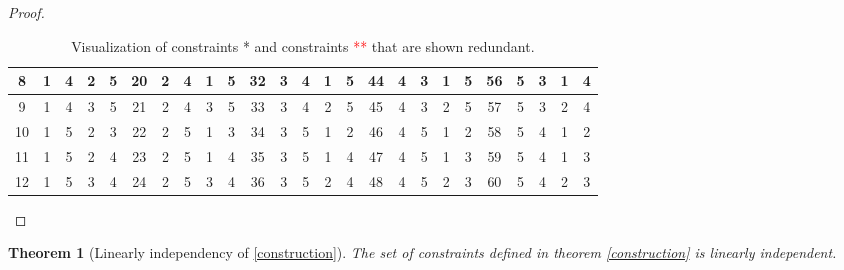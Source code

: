 \documentclass{scrartcl}
\newtheorem{theorem}{Theorem}
\theoremstyle{plain}
\begin{document}
\begin{proof}
\begin{table}[h!]
{\begin{tabular}{||c | c c c c||c | c c c c||c | c c c c||c | c c c c||c | c c c c||}
				\hline
				8 & 1 & 4 & 2 & 5 & 20 & 2 & 4 & 1 & 5 & 32 & 3 & 4 & 1 & 5 & 44 & 4 & 3 & 1 & 5 & 56 & \cellcolor{red!50}5 & \cellcolor{red!50}3 & \cellcolor{red!50}1 & \cellcolor{red!50}4 \\ 
				\hline
				9 & \cellcolor{red!25}1 & \cellcolor{red!25}4 & \cellcolor{red!25}3 & \cellcolor{red!25}5 & 21 & \cellcolor{red!25}2 & \cellcolor{red!25}4 & \cellcolor{red!25}3 & \cellcolor{red!25}5 & 33 & \cellcolor{red!25}3 & \cellcolor{red!25}4 & \cellcolor{red!25}2 & \cellcolor{red!25}5 & 45 & \cellcolor{red!25}4 & \cellcolor{red!25}3 & \cellcolor{red!25}2 & \cellcolor{red!25}5 & 57 & \cellcolor{red!25}5 & \cellcolor{red!25}3 & \cellcolor{red!25}2 & \cellcolor{red!25}4 \\ 
				\hline
				10 & 1 & 5 & 2 & 3 & 22 & 2 & 5 & 1 & 3 & 34 & 3 & 5 & 1 & 2 & 46 & 4 & 5 & 1 & 2 & 58 & \cellcolor{red!50}5 & \cellcolor{red!50}4 & \cellcolor{red!50}1 & \cellcolor{red!50}2 \\ 
				\hline
				11 & 1 & 5 & 2 & 4 & 23 & 2 & 5 & 1 & 4 & 35 & 3 & 5 & 1 & 4 & 47 & 4 & 5 & 1 & 3 & 59 & \cellcolor{red!50}5 & \cellcolor{red!50}4 & \cellcolor{red!50}1 & \cellcolor{red!50}3 \\ 
				\hline
				12 & \cellcolor{red!25}1 & \cellcolor{red!25}5 & \cellcolor{red!25}3 & \cellcolor{red!25}4 & 24 & \cellcolor{red!25}2 & \cellcolor{red!25}5 & \cellcolor{red!25}3 & \cellcolor{red!25}4 & 36 & \cellcolor{red!25}3 & \cellcolor{red!25}5 & \cellcolor{red!25}2 & \cellcolor{red!25}4 & 48 & \cellcolor{red!25}4 & \cellcolor{red!25}5 & \cellcolor{red!25}2 & \cellcolor{red!25}3 & 60 & \cellcolor{red!25}5 & \cellcolor{red!25}4 & \cellcolor{red!25}2 & \cellcolor{red!25}3 \\ 
				\hline
			\end{tabular}%
		}
		\caption{Visualization of constraints \textcolor{red!35}{*} and constraints \textcolor{red}{**} that are shown redundant.}
	\end{table}
\end{proof}

\begin{mdframed}
\begin{theorem}[Linearly independency of \ref{construction}] \label{lin}
	The set of constraints defined in theorem \ref{construction} is linearly independent.
\end{theorem}
\vspace{7pt}
\end{mdframed}
\end{document}
